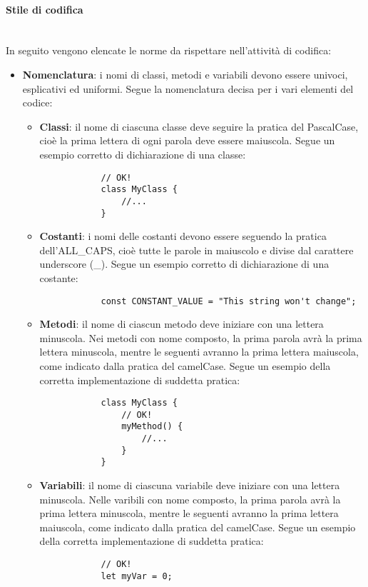 			\paragraph*{Stile di codifica}\mbox{}\\ [1mm]
			In seguito vengono elencate le norme da rispettare nell'attività di codifica:
			\begin{itemize}
				\item \textbf{Nomenclatura}: i nomi di classi, metodi e variabili devono essere univoci, esplicativi ed uniformi. Segue la nomenclatura decisa per i vari elementi del codice:
				\begin{itemize}
					\item \textbf{Classi}: il nome di ciascuna classe deve seguire la pratica del PascalCase, cioè la prima lettera di ogni parola deve essere maiuscola. Segue un esempio corretto di dichiarazione di una classe:
			\begin{verbatim}
			// OK!
			class MyClass {
			    //...
			}
			\end{verbatim} 
					\item \textbf{Costanti}: i nomi delle costanti devono essere seguendo la pratica dell'ALL\_CAPS, cioè tutte le parole in maiuscolo e divise dal carattere underscore (\_). Segue un esempio corretto di dichiarazione di una costante:
			\begin{verbatim}
			const CONSTANT_VALUE = "This string won't change";
			\end{verbatim}
					\item \textbf{Metodi}: il nome di ciascun metodo deve iniziare con una lettera minuscola. Nei metodi con nome composto, la prima parola avrà la prima lettera minuscola, mentre le seguenti avranno la prima lettera maiuscola, come indicato dalla pratica del camelCase. Segue un esempio della corretta implementazione di suddetta pratica:
			\begin{verbatim}
			class MyClass {
			    // OK!
			    myMethod() {
			        //...
			    }
			}
			\end{verbatim}
				\item \textbf{Variabili}: il nome di ciascuna variabile deve iniziare con una lettera minuscola. Nelle varibili con nome composto, la prima parola avrà la prima lettera minuscola, mentre le seguenti avranno la prima lettera maiuscola, come indicato dalla pratica del camelCase. Segue un esempio della corretta implementazione di suddetta pratica:
			\begin{verbatim}
			// OK!
			let myVar = 0;
			\end{verbatim}

\end{itemize}
\end{itemize}
